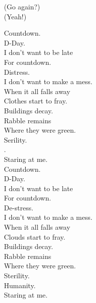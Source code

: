 
\label{album:sketches-of-brunswick-east}




(Go again?) \\
(Yeah!) \\






Countdown. \\
D-Day. \\
I don't want to be late \\
For countdown. \\
Distress. \\
I don't want to make a mess. \\

When it all falls away \\
Clothes start to fray. \\
Buildings decay. \\
Rabble remains \\
Where they were green. \\
Serility. \\
. \\
Staring at me. \\

Countdown. \\
D-Day. \\
I don't want to be late \\
For countdown. \\
De-stress. \\
I don't want to make a mess. \\

When it all falls away \\
Clouds start to fray. \\
Buildings decay. \\
Rabble remains \\
Where they were green. \\
Sterility. \\
Humanity. \\
Staring at me. \\

